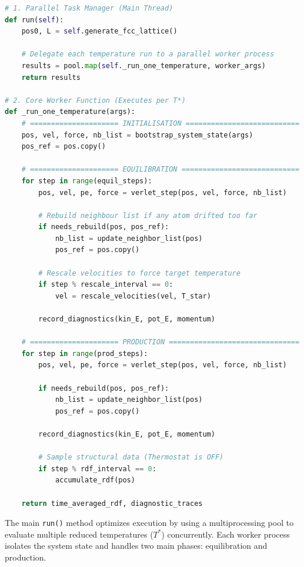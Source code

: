 \begin{lstlisting}[language=Python, caption={High-level architectural map of the integrated MD execution flow. The main thread distributes the workload, while individual worker processes handle the time integration and data collection for each temperature point.}, label={lst:main_loop}]
# 1. Parallel Task Manager (Main Thread)
def run(self):
    pos0, L = self.generate_fcc_lattice()
    
    # Delegate each temperature run to a parallel worker process
    results = pool.map(self._run_one_temperature, worker_args)
    return results

# 2. Core Worker Function (Executes per T*)
def _run_one_temperature(args):
    # ===================== INITIALISATION ===========================
    pos, vel, force, nb_list = bootstrap_system_state(args)
    pos_ref = pos.copy()
    
    # ===================== EQUILIBRATION ============================
    for step in range(equil_steps):
        pos, vel, pe, force = verlet_step(pos, vel, force, nb_list)
        
        # Rebuild neighbour list if any atom drifted too far
        if needs_rebuild(pos, pos_ref):
            nb_list = update_neighbor_list(pos)
            pos_ref = pos.copy()
            
        # Rescale velocities to force target temperature
        if step % rescale_interval == 0:
            vel = rescale_velocities(vel, T_star)
            
        record_diagnostics(kin_E, pot_E, momentum)

    # ===================== PRODUCTION ===============================
    for step in range(prod_steps):
        pos, vel, pe, force = verlet_step(pos, vel, force, nb_list)
        
        if needs_rebuild(pos, pos_ref):
            nb_list = update_neighbor_list(pos)
            pos_ref = pos.copy()
            
        record_diagnostics(kin_E, pot_E, momentum)
        
        # Sample structural data (Thermostat is OFF)
        if step % rdf_interval == 0:
            accumulate_rdf(pos)

    return time_averaged_rdf, diagnostic_traces
\end{lstlisting}

The main \texttt{run()} method optimizes execution by using a multiprocessing pool to evaluate multiple reduced temperatures ($T^*$) concurrently. Each worker process isolates the system state and handles two main phases: equilibration and production. 

